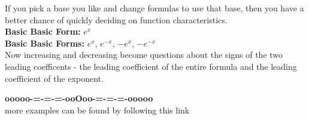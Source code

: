 \documentclass{ximera}
\begin{document}
If you pick a base you like and change formulas to use that base, then you have a better chance of quickly deciding on function characteristics. \\



\textbf{\textcolor{blue!55!black}{Basic Basic Form:}}  $e^x$ \\



\textbf{\textcolor{blue!55!black}{Basic Basic Forms:}}  $e^x$, $e^{-x}$, $-e^x$, $-e^{-x}$ \\


Now increasing and decreasing become questions about the signs of the two leading coefficents - the leading coefficient of the entire formula and the leading coefficient of the exponent.




\begin{center}
\textbf{\textcolor{green!50!black}{ooooo-=-=-=-ooOoo-=-=-=-ooooo}} \\

more examples can be found by following this link\\ 

\end{center}
\end{document}
